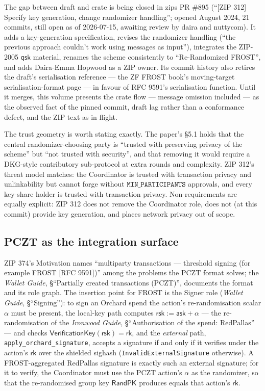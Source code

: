 \documentclass[11pt,a4paper]{article}
\theoremstyle{definition}
\newcommand{\rk}{\mathsf{rk}}
\newcommand{\ask}{\ensuremath{\mathsf{ask}}}
\newcommand{\rsk}{\ensuremath{\mathsf{rsk}}}
\begin{document}
The gap between draft and crate is being closed in zips PR \#895
(``[ZIP 312] Specify key generation, change randomizer handling''; opened
August 2024, 21 commits, still open as of 2026-07-15, awaiting review by
daira and nuttycom). It adds a key-generation specification, revises the
randomizer handling (``the previous approach couldn't work using messages
as input''), integrates the ZIP-2005 $\mathsf{qsk}$ material, renames the
scheme consistently to ``Re-Randomized FROST'', and adds Daira-Emma
Hopwood as a ZIP owner. Its commit history also retires the draft's
serialisation reference --- the ZF FROST book's moving-target
serialisation-format page --- in favour of RFC 9591's serialisation
function. Until it merges, this volume presents the crate flow ---
message omission included --- as the observed fact of the pinned
commit, draft lag rather than a conformance defect, and the ZIP text as
in flight.

The trust geometry is worth stating exactly. The paper's \S5.1 holds that
the central randomizer-choosing party is ``trusted with preserving privacy
of the scheme'' but ``not trusted with security'', and that removing it
would require a DKG-style contributory sub-protocol at extra rounds and
complexity. ZIP 312's threat model matches: the Coordinator is trusted
with transaction privacy and unlinkability but cannot forge without
$\mathtt{MIN\_PARTICIPANTS}$ approvals, and every key-share holder is
trusted with transaction privacy. Non-requirements are equally explicit:
ZIP 312 does not remove the Coordinator role, does not (at this commit)
provide key generation, and places network privacy out of scope.

\subsection{PCZT as the integration surface}\label{sec:fr-deploy-pczt}

ZIP 374's Motivation names ``multiparty transactions --- threshold signing
(for example FROST [RFC 9591])'' among the problems the PCZT format
solves; the \emph{Wallet Guide}, \S``Partially created transactions
(PCZT)'', documents the format and its role graph. The insertion point for
FROST is the Signer role (\emph{Wallet Guide}, \S``Signing''): to sign an
Orchard spend the action's re-randomisation scalar $\alpha$ must be
present, the local-key path computes $\rsk := \ask + \alpha$ ---
the re-randomisation of the \emph{Ironwood Guide}, \S``Authorisation of
the spend: RedPallas'' --- and checks
$\mathsf{VerificationKey}(\rsk) = \rk$, and the
\emph{external} path, \texttt{apply\_orchard\_signature}, accepts a
signature if and only if it verifies under the action's $\rk$ over the
shielded sighash (\texttt{InvalidExternalSignature} otherwise). A
FROST-aggregated RedPallas signature is exactly such an external
signature; for it to verify, the Coordinator must use the PCZT action's
$\alpha$ as the randomizer, so that the re-randomised group key
$\mathsf{RandPK}$ produces equals that action's $\rk$.
\end{document}
